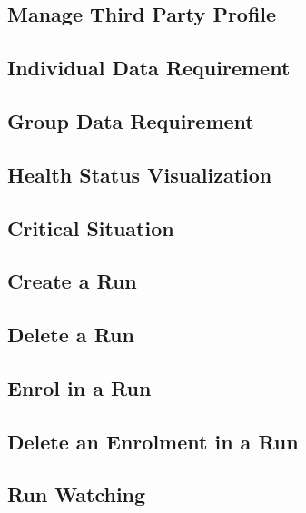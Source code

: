 \subsection{Manage Third Party Profile}

\clearpage

\subsection{Individual Data Requirement}

\clearpage

\subsection{Group Data Requirement}

\clearpage

\subsection{Health Status Visualization}

\clearpage

\subsection{Critical Situation}

\clearpage

\subsection{Create a Run}

\clearpage

\subsection{Delete a Run}

\clearpage

\subsection{Enrol in a Run}

\clearpage

\subsection{Delete an Enrolment in a Run}

\clearpage

\subsection{Run Watching}

\clearpage
